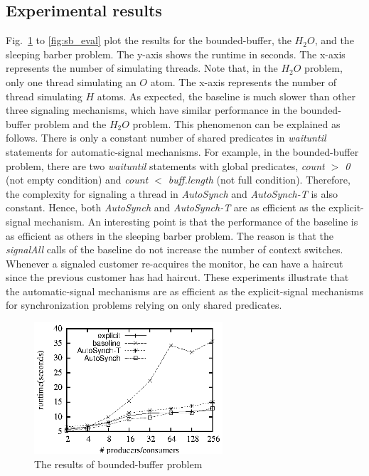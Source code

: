 \documentclass{sigplanconf}
\begin{document}
\subsection{Experimental results}


Fig.~\ref{fig:pc_eval} to \ref{fig:sb_eval} plot the results for the
bounded-buffer, the $H_2O$, and the sleeping barber problem. The y-axis shows
the runtime in seconds. The x-axis represents the number of simulating threads. 
Note that, in the $H_2O$ problem, only one thread simulating an $O$ atom. The
x-axis represents the number of thread simulating $H$ atoms. 
As expected, 
the baseline is much slower than other three signaling mechanisms, which have
similar performance in the bounded-buffer problem and the $H_2O$ problem. This 
phenomenon can be explained as follows. There is only a constant number of
shared predicates in {\em waituntil} statements for automatic-signal mechanisms.  
For example, in the bounded-buffer problem, there are two {\em waituntil} statements 
with global predicates, {\em count $>$ 0} (not empty condition) and {\em count
$<$ buff.length} (not full condition). Therefore, the 
complexity for signaling a thread in {\em AutoSynch} and {\em AutoSynch-T} is 
also constant. Hence, both {\em AutoSynch} and {\em AutoSynch-T} are as 
efficient as the explicit-signal mechanism. An interesting point is that the
performance of the baseline is as efficient as others in the sleeping barber
problem. The reason is that the {\em signalAll} calls of the baseline do not
increase the number of context switches. Whenever a signaled customer
re-acquires the monitor, he can have a haircut since the previous customer has
had haircut. These experiments illustrate that the automatic-signal mechanisms
are as efficient as the explicit-signal mechanisms for synchronization 
problems relying on only shared predicates. 

\begin{figure}[ht!]
  \centering
  \includegraphics[width=70mm]{fig/pc.eps}
  \caption{The results of bounded-buffer problem}
  \label{fig:pc_eval}
\end{figure}
\end{document}
